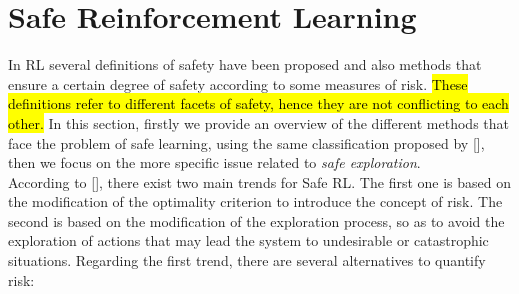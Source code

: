 \section{Safe Reinforcement Learning}\label{sec:saferl}
In \ac{RL} several definitions of safety have been proposed and also methods that ensure a certain degree of safety according to some measures of risk. \hl{These definitions refer to different facets of safety, hence they are not conflicting to each other.} In this section, firstly we provide an overview of the different methods that face the problem of safe learning, using the same classification proposed by [\citeauthor{JMLR:v16:garcia15a}], then we focus on the more specific issue related to \emph{safe exploration}.\\
\newline
According to [\cite{JMLR:v16:garcia15a}], there exist two main trends for Safe \ac{RL}. The first one is based on the modification of the optimality criterion to introduce the concept of risk. The second is based on the modification of the exploration process, so as to avoid the exploration of actions that may lead the system to undesirable or catastrophic situations. Regarding the first trend, there are several alternatives to quantify risk:

